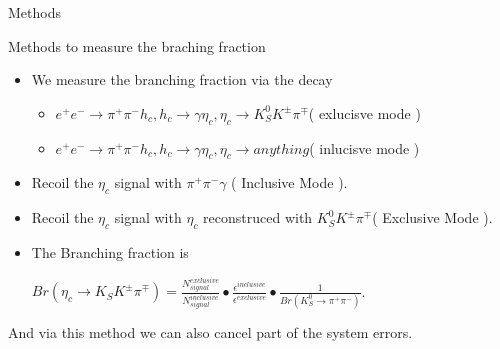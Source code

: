 \documentclass{beamer}
\begin{document}
\begin{frame}{Methods}
    \begin{block}{Methods to measure the braching fraction}
        \begin{itemize}
            \bigskip
            \item We measure the branching fraction via the decay
                \begin{itemize}
                    \item $e^+e^-\to \pi^+ \pi^- h_c, h_c\to \gamma\eta_c, \eta_c\to K_S^0 K^{\pm}\pi^{\mp}$( exlucisve mode )
                    \item $e^+e^-\to \pi^+ \pi^- h_c, h_c\to \gamma\eta_c, \eta_c\to anything$( inlucisve mode )
                \end{itemize}
            \bigskip
            \item Recoil the $\eta_c$ signal with $\pi^+\pi^-\gamma$ ( Inclusive Mode ).
            \item Recoil the $\eta_c$ signal with $\eta_c$ reconstruced with $K_S^0 K^{\pm} \pi^{\mp}$( Exclusive Mode ).
            \bigskip
            \item The Branching fraction is\\
                \begin{center}
                    $Br(\eta_c\to K_S K^{\pm}\pi^{\mp}) = \frac{N^{exclusive}_{signal}}{N^{inclusive}_{signal}}\bullet\frac{\epsilon^{inclusive}}{\epsilon^{exclusive}}\bullet\frac{1}{Br(K^0_S\to\pi^+\pi^{-})}$.
                \end{center}
        \end{itemize}
    \end{block}
    And via this method we can also cancel part of the system errors.
\end{frame}
\end{document}
